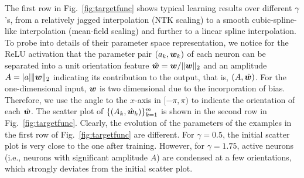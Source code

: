 \documentclass[twoside,11pt]{article}
\begin{document}
The first row in Fig.~\ref{fig:targetfunc} shows typical learning results over different $\gamma$'s, from a relatively jagged interpolation (NTK scaling) to a smooth cubic-spline-like interpolation (mean-field scaling) and further to a linear spline interpolation. To probe into details of their parameter space representation, we notice for the ReLU activation that the parameter pair $(a_k,\bm{w}_k)$ of each neuron can be separated into a unit orientation feature $\hat{\bm{w}}=\bm{w}/\lVert\bm{w}\rVert_{2}$ and an amplitude $A=|a|\lVert\bm{w}\rVert_{2}$ indicating its contribution to the output, that is, $(A,\hat{\bm{w}})$. For the one-dimensional input, $\bm{w}$ is two dimensional due to the incorporation of bias. Therefore, we use the angle to the $x$-axis in $[-\pi,\pi)$ to indicate the orientation of each $\hat{\bm{w}}$. The scatter plot of $\{(A_k,\hat{\bm{w}}_k)\}_{k=1}^{m}$ is shown in the second row in Fig.~\ref{fig:targetfunc}. Clearly, the evolution of the parameters of the examples in the first row of Fig.~\ref{fig:targetfunc} are different. For $\gamma=0.5$, the initial scatter plot is very close to the one after training. However, for $\gamma=1.75$, active neurons (i.e., neurons with significant amplitude $A$) are condensed at a few orientations, which strongly deviates from the initial scatter plot.
\end{document}
